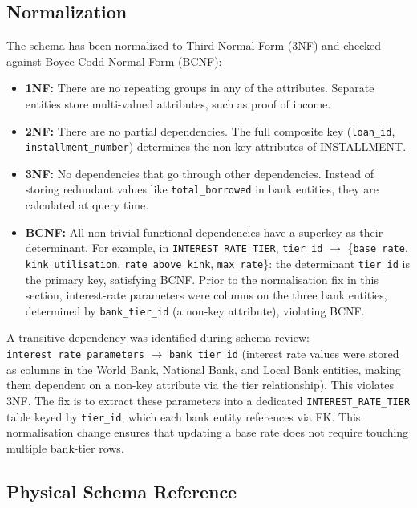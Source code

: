 \documentclass[12pt,a4paper]{report}
\begin{document}
\subsection{Normalization}
\label{sec:normalization}

The schema has been normalized to Third Normal Form (3NF) and checked against Boyce-Codd Normal Form (BCNF):

\begin{itemize}[noitemsep]
\item \textbf{1NF:} There are no repeating groups in any of the attributes. Separate entities store multi-valued attributes, such as proof of income.
\item \textbf{2NF:} There are no partial dependencies. The full composite key (\texttt{loan\_id}, \texttt{installment\_number}) determines the non-key attributes of INSTALLMENT.
\item \textbf{3NF:} No dependencies that go through other dependencies. Instead of storing redundant values like \texttt{total\_borrowed} in bank entities, they are calculated at query time.
\item \textbf{BCNF:} All non-trivial functional dependencies have a superkey as their determinant. For example, in \texttt{INTEREST\_RATE\_TIER}, \texttt{tier\_id} $\to$ \{\texttt{base\_rate}, \texttt{kink\_utilisation}, \texttt{rate\_above\_kink}, \texttt{max\_rate}\}: the determinant \texttt{tier\_id} is the primary key, satisfying BCNF. Prior to the normalisation fix in this section, interest-rate parameters were columns on the three bank entities, determined by \texttt{bank\_tier\_id} (a non-key attribute), violating BCNF.
\end{itemize}

A transitive dependency was identified during schema review: \texttt{interest\_rate\_parameters} $\to$ \texttt{bank\_tier\_id} (interest rate values were stored as columns in the World Bank, National Bank, and Local Bank entities, making them dependent on a non-key attribute via the tier relationship). This violates 3NF. The fix is to extract these parameters into a dedicated \texttt{INTEREST\_RATE\_TIER} table keyed by \texttt{tier\_id}, which each bank entity references via FK. This normalisation change ensures that updating a base rate does not require touching multiple bank-tier rows.

\subsection{Physical Schema Reference}
\end{document}
